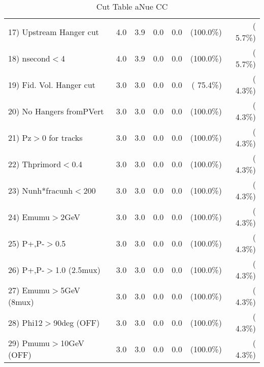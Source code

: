 \begin{table}[h!]
\begin{tabular}{||l||r|r|r|r|r|r||}
 17) Upstream Hanger cut  &          4.0 &          3.9 &          0.0 &          0.0 & (100.0\%) & (  5.7\%) \\
 18) nsecond$<$4          &          4.0 &          3.9 &          0.0 &          0.0 & (100.0\%) & (  5.7\%) \\
 19) Fid. Vol. Hanger cut &          3.0 &          3.0 &          0.0 &          0.0 & ( 75.4\%) & (  4.3\%) \\
 20) No Hangers fromPVert &          3.0 &          3.0 &          0.0 &          0.0 & (100.0\%) & (  4.3\%) \\
 21) Pz$>$0 for tracks    &          3.0 &          3.0 &          0.0 &          0.0 & (100.0\%) & (  4.3\%) \\
 22) Thprimord$<$0.4      &          3.0 &          3.0 &          0.0 &          0.0 & (100.0\%) & (  4.3\%) \\
 23) Nunh*fracunh$<$200   &          3.0 &          3.0 &          0.0 &          0.0 & (100.0\%) & (  4.3\%) \\
 24) Emumu$>$2GeV         &          3.0 &          3.0 &          0.0 &          0.0 & (100.0\%) & (  4.3\%) \\
 25) P+,P-$>$0.5          &          3.0 &          3.0 &          0.0 &          0.0 & (100.0\%) & (  4.3\%) \\
 26) P+,P-$>$1.0 (2.5mux) &          3.0 &          3.0 &          0.0 &          0.0 & (100.0\%) & (  4.3\%) \\
 27) Emumu$>$5GeV  (8mux) &          3.0 &          3.0 &          0.0 &          0.0 & (100.0\%) & (  4.3\%) \\
 28) Phi12$>$90deg  (OFF) &          3.0 &          3.0 &          0.0 &          0.0 & (100.0\%) & (  4.3\%) \\
 29) Pmumu$>$10GeV  (OFF) &          3.0 &          3.0 &          0.0 &          0.0 & (100.0\%) & (  4.3\%) \\
 \hline
 \hline
 \end{tabular}
 \caption{Cut Table  aNue CC  }
 \label{tab-cutcohjpsi-mumu_anuecc}
 \end{table}
